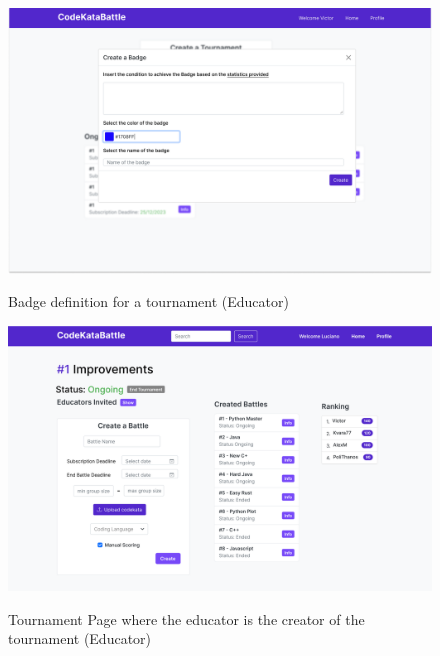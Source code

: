 \documentclass{Configuration_Files/Template}
\begin{document}
\begin{figure}[H]
\centering
\includegraphics[scale = 0.25]{DD_latex/Images/UI/MainPageEducator-1.png}\\
\caption{Badge definition for a tournament (Educator)}
\end{figure}

\begin{figure}[H]
\centering
\includegraphics[scale = 0.25]{DD_latex/Images/UI/TournamentPage_EducatorCreator.png}\\
\caption{Tournament Page where the educator is the creator of the tournament (Educator)}
\end{figure}
\end{document}

